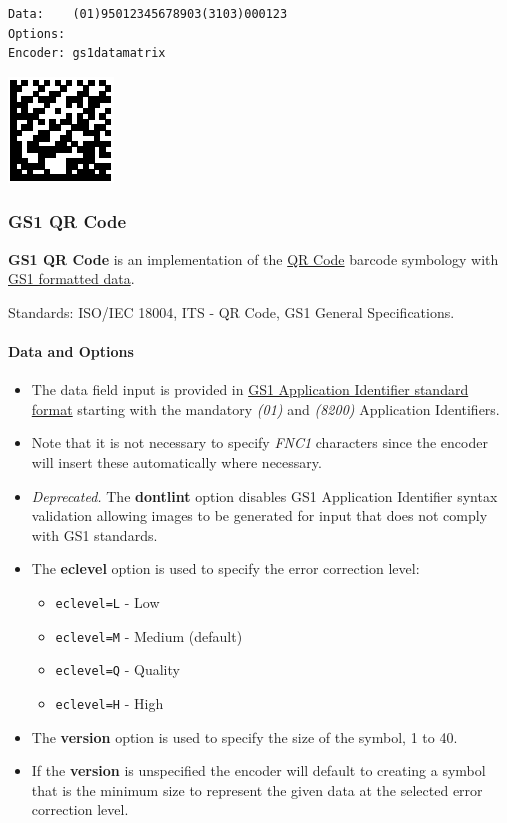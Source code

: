 \begin{verbatim}
Data:    (01)95012345678903(3103)000123
Options: 
Encoder: gs1datamatrix
\end{verbatim}

\includegraphics{images/gs1datamatrix-1.eps}

\hypertarget{gs1-qr-code}{%
\subsubsection{GS1 QR Code}\label{gs1-qr-code}}

\textbf{GS1 QR Code} is an implementation of the
\protect\hyperlink{qr-code}{QR Code} barcode symbology with
\protect\hyperlink{gs1-application-identifier-standard-format}{GS1
formatted data}.

Standards: ISO/IEC 18004, ITS - QR Code, GS1 General Specifications.

\hypertarget{data-and-options-29}{%
\paragraph{Data and Options}\label{data-and-options-29}}

\begin{itemize}
\tightlist
\item
  The data field input is provided in
  \protect\hyperlink{gs1-application-identifier-standard-format}{GS1
  Application Identifier standard format} starting with the mandatory
  \emph{(01)} and \emph{(8200)} Application Identifiers.
\item
  Note that it is not necessary to specify \emph{FNC1} characters since
  the encoder will insert these automatically where necessary.
\item
  \emph{Deprecated.} The \textbf{dontlint} option disables GS1
  Application Identifier syntax validation allowing images to be
  generated for input that does not comply with GS1 standards.
\item
  The \textbf{eclevel} option is used to specify the error correction
  level:

  \begin{itemize}
  \tightlist
  \item
    \texttt{eclevel=L} - Low
  \item
    \texttt{eclevel=M} - Medium (default)
  \item
    \texttt{eclevel=Q} - Quality
  \item
    \texttt{eclevel=H} - High
  \end{itemize}
\item
  The \textbf{version} option is used to specify the size of the symbol,
  1 to 40.
\item
  If the \textbf{version} is unspecified the encoder will default to
  creating a symbol that is the minimum size to represent the given data
  at the selected error correction level.
\end{itemize}

